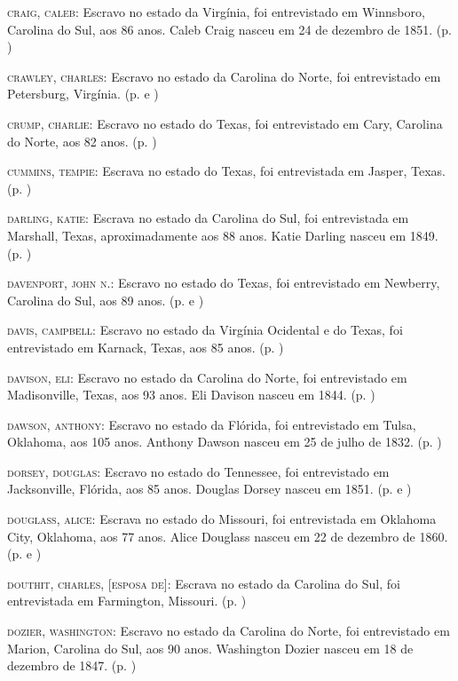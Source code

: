 \begin{Parskip}
\textsc{craig, caleb:} Escravo no estado da Virgínia, foi entrevistado
em Winnsboro, Carolina do Sul, aos 86 anos. Caleb Craig nasceu em 24 de
dezembro de 1851. (p. \pageref{ref60})

\textsc{crawley, charles:} Escravo no estado da Carolina do Norte, foi
entrevistado em Petersburg, Virgínia. (p. \pageref{ref61} e \pageref{ref62})

\textsc{crump, charlie:} Escravo no estado do Texas, foi entrevistado em
Cary, Carolina do Norte, aos 82 anos. (p. \pageref{ref63})

\textsc{cummins, tempie:} Escrava no estado do Texas, foi entrevistada
em Jasper, Texas. (p. \pageref{ref64})

\textsc{darling, katie:} Escrava no estado da Carolina do Sul, foi
entrevistada em Marshall, Texas, aproximadamente aos 88 anos. Katie
Darling nasceu em 1849. (p. \pageref{ref65})

\textsc{davenport, john n.:} Escravo no estado do Texas, foi
entrevistado em Newberry, Carolina do Sul, aos 89 anos. (p. \pageref{ref66} e \pageref{ref67})

\textsc{davis, campbell:} Escravo no estado da Virgínia Ocidental e do
Texas, foi entrevistado em Karnack, Texas, aos 85 anos. (p. \pageref{ref68})

\textsc{davison, eli:} Escravo no estado da Carolina do Norte, foi
entrevistado em Madisonville, Texas, aos 93 anos. Eli Davison nasceu em
1844. (p. \pageref{ref69})

\textsc{dawson, anthony:} Escravo no estado da Flórida, foi entrevistado
em Tulsa, Oklahoma, aos 105 anos. Anthony Dawson nasceu em 25 de julho
de 1832. (p. \pageref{ref70})

\textsc{dorsey, douglas:} Escravo no estado do Tennessee, foi
entrevistado em Jacksonville, Flórida, aos 85 anos. Douglas Dorsey
nasceu em 1851. (p. \pageref{ref71} e \pageref{ref72})

\textsc{douglass, alice:} Escrava no estado do Missouri, foi
entrevistada em Oklahoma City, Oklahoma, aos 77 anos. Alice Douglass
nasceu em 22 de dezembro de 1860. (p. \pageref{ref73} e \pageref{ref74})

\textsc{douthit, charles, {[}esposa de{]}:} Escrava no estado da
Carolina do Sul, foi entrevistada em Farmington, Missouri. (p. \pageref{ref75})

\textsc{dozier, washington:} Escravo no estado da Carolina do Norte, foi
entrevistado em Marion, Carolina do Sul, aos 90 anos. Washington Dozier
nasceu em 18 de dezembro de 1847. (p. \pageref{ref76})


\end{Parskip}
